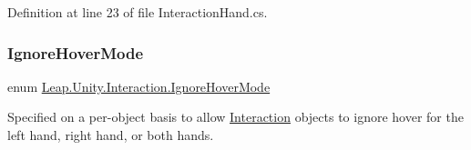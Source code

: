 Definition at line 23 of file Interaction\+Hand.\+cs.

\mbox{\label{namespace_leap_1_1_unity_1_1_interaction_aba04c439c84829d617115cfd977cb11b}} 
\subsubsection{\texorpdfstring{IgnoreHoverMode}{IgnoreHoverMode}}
{\footnotesize\ttfamily enum \mbox{\hyperlink{namespace_leap_1_1_unity_1_1_interaction_aba04c439c84829d617115cfd977cb11b}{Leap.\+Unity.\+Interaction.\+Ignore\+Hover\+Mode}}\hspace{0.3cm}{\ttfamily [strong]}}



Specified on a per-\/object basis to allow \mbox{\hyperlink{namespace_leap_1_1_unity_1_1_interaction}{Interaction}} objects to ignore hover for the left hand, right hand, or both hands. 

